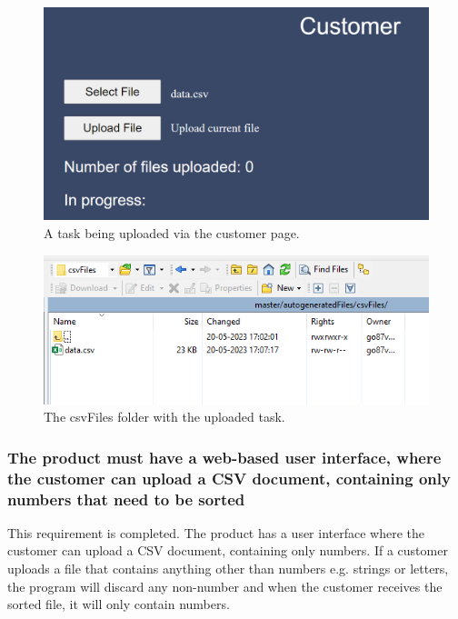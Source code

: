 \begin{figure}[H]
    \centering
    \includegraphics[scale=.5]{figures/uploadFileToServer.png}
    \caption{A task being uploaded via the customer page.}
    \label{fig:uploadFileToServer}
\end{figure}

\begin{figure}[H]
    \centering
    \includegraphics[scale=.5]{figures/csvFilesWithUpload.png}
    \caption{The csvFiles folder with the uploaded task.}
    \label{fig:csvFilesWithUpload}
\end{figure}


\subsubsection{The product must have a web-based user interface, where the customer can upload a CSV document, containing only numbers that need to be sorted}
This requirement is completed. The product has a user interface where the customer can upload a CSV document, containing only numbers. If a customer uploads a file that contains anything other than numbers e.g. strings or letters, the program will discard any non-number and when the customer receives the sorted file, it will only contain numbers.

